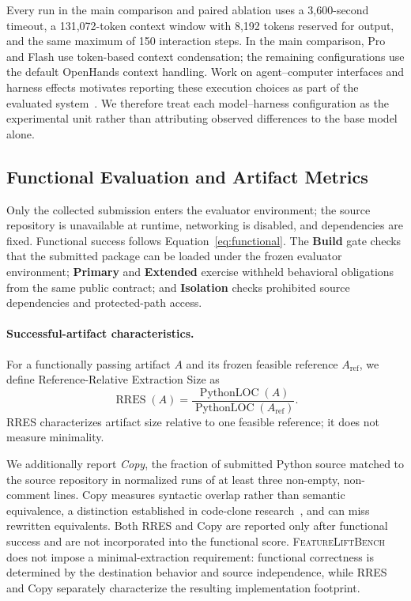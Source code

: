 \documentclass[acmsmall,screen,review,anonymous]{acmart}
\newcommand{\flb}{\textsc{FeatureLiftBench}\xspace}
\begin{document}
Every run in the main comparison and paired ablation uses a 3,600-second timeout,
a 131,072-token context window with 8,192 tokens reserved for output, and the
same maximum of 150 interaction steps. In the main comparison, Pro and Flash use
token-based context condensation; the remaining configurations use the default
OpenHands context handling. Work on agent--computer interfaces and harness
effects motivates reporting these execution choices as part of the evaluated
system~\cite{yang2024sweagent,yao2026harnessbench}. We therefore treat each
model--harness configuration as the experimental unit rather than attributing
observed differences to the base model alone.

\subsection{Functional Evaluation and Artifact Metrics}

Only the collected submission enters the evaluator environment; the source
repository is unavailable at runtime, networking is disabled, and dependencies
are fixed. Functional success follows Equation~\ref{eq:functional}. The
\textbf{Build} gate checks that the submitted package can be loaded under the
frozen evaluator environment; \textbf{Primary} and \textbf{Extended} exercise
withheld behavioral obligations from the same public contract; and
\textbf{Isolation} checks prohibited source dependencies and protected-path
access.

\paragraph{Successful-artifact characteristics.}
For a functionally passing artifact $A$ and its frozen feasible reference
$A_{\mathrm{ref}}$, we define Reference-Relative Extraction Size as
\begin{equation}
  \operatorname{RRES}(A)=
  \frac{\operatorname{PythonLOC}(A)}
       {\operatorname{PythonLOC}(A_{\mathrm{ref}})}.
  \label{eq:rres}
\end{equation}
RRES characterizes artifact size relative to one feasible reference; it does
not measure minimality.

We additionally report \emph{Copy}, the fraction of submitted Python source
matched to the source repository in normalized runs of at least three non-empty,
non-comment lines. Copy measures syntactic overlap rather than semantic
equivalence, a distinction established in code-clone
research~\cite{roy2009clones}, and can miss rewritten equivalents.
Both RRES and Copy are reported only after functional success and
are not incorporated into the functional score.
\flb does not impose a minimal-extraction requirement: functional correctness
is determined by the destination behavior and source independence, while RRES
and Copy separately characterize the resulting implementation footprint.
\end{document}
